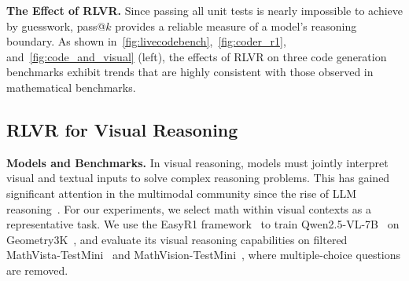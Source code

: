 \textbf{The Effect of RLVR.}  
Since passing all unit tests is nearly impossible to achieve by guesswork, pass@$k$ provides a reliable measure of a model's reasoning boundary.
As shown in~\cref{fig:livecodebench},~\cref{fig:coder_r1}, and~\cref{fig:code_and_visual} (left), the effects of RLVR on three code generation benchmarks exhibit trends that are highly consistent with those observed in mathematical benchmarks.  


\vspace{-1mm}
\subsection{RLVR for Visual Reasoning} 


\textbf{Models and Benchmarks.}
In visual reasoning, models must jointly interpret visual and textual inputs to solve complex reasoning problems.
This has gained significant attention in the multimodal community since the rise of LLM reasoning~\cite{chen2025r1v,shen2025vlmr1,zheng2025easyr1}.
For our experiments, 
we select math within visual contexts as a representative task.
We use the EasyR1 framework~\cite{zheng2025easyr1} to train Qwen2.5-VL-7B~\cite{bai2025qwen25vl} on Geometry3K~\cite{lu2021geo3k}, and evaluate its visual reasoning capabilities on filtered MathVista-TestMini~\cite{lu2024mathvista} and MathVision-TestMini~\cite{wang2024mathvision}, where multiple-choice questions are removed.  

